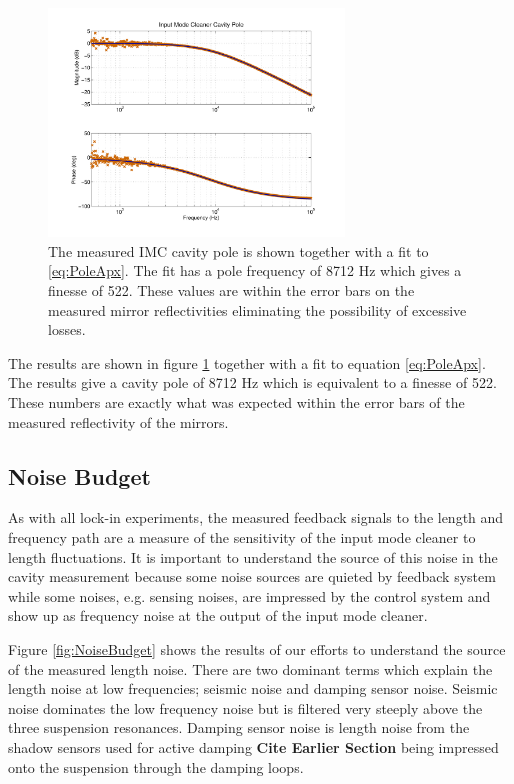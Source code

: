 \documentclass[10pt]{article}
\begin{document}
\begin{figure}[ht]
	\centering
	\includegraphics[width = 0.7\textwidth, trim = 2.5cm 1.5cm 2.5cm 1cm]{Cavity_Pole.pdf}
	\caption{The measured IMC cavity pole is shown together with a fit 
		to \eqref{eq:PoleApx}.  The fit has a pole frequency of 8712 Hz 
		which gives a finesse of 522.  These values are within the error 
		bars on the measured mirror reflectivities eliminating the 
		possibility of excessive losses.}
	\label{fig:cavPole}
\end{figure}

The results are shown in figure \ref{fig:cavPole} together with a fit to equation 
\eqref{eq:PoleApx}.  The results give a cavity pole of 8712 Hz which is equivalent 
to a finesse of 522.  
These numbers are exactly what was expected within the error bars of the measured 
reflectivity of the mirrors.  

\subsection{Noise Budget}

As with all lock-in experiments, the measured feedback signals to the length and 
frequency path are a measure of the sensitivity of the input mode cleaner to length 
fluctuations.  
It is important to understand the source of this noise in the cavity measurement because 
some noise sources are quieted by feedback system while some noises, e.g. sensing noises, 
are impressed by the control system and show up
as frequency noise at the output of the input mode cleaner.  

Figure \ref{fig:NoiseBudget} shows the results of our efforts to understand the source 
of the measured length noise.  
There are two dominant terms which explain the length noise at low frequencies; 
seismic noise and damping sensor noise.  
Seismic noise dominates the low frequency noise but is filtered very steeply above the 
three suspension resonances.  
Damping sensor noise is length noise from the shadow sensors used for active damping
\textbf{Cite Earlier Section} being impressed onto the suspension through the damping loops.  
\end{document}
